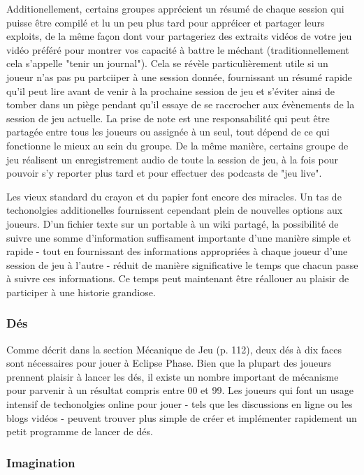 Additionellement, certains groupes apprécient un résumé de chaque session qui puisse être compilé et lu un peu plus tard pour appréicer et partager leurs exploits, de la même façon dont vour partageriez des extraits vidéos de votre jeu vidéo préféré pour montrer vos capacité à battre le méchant (traditionnellement cela s'appelle "tenir un journal"). Cela se révèle particulièrement utile si un joueur n'as pas pu partciiper à une session donnée, fournissant un résumé rapide qu'il peut lire avant de venir à la prochaine session de jeu et s'éviter ainsi de tomber dans un piège pendant qu'il essaye de se raccrocher aux évènements de la session de jeu actuelle. La prise de note est une responsabilité qui peut être partagée entre tous les joueurs ou assignée à un seul, tout dépend de ce qui fonctionne le mieux au sein du groupe. De la même manière, certains groupe de jeu réalisent un enregistrement audio de toute la session de jeu, à la fois pour pouvoir s'y reporter plus tard et pour effectuer des podcasts de "jeu live". 

Les vieux standard du crayon et du papier font encore des miracles. Un tas de techonolgies additionelles fournissent cependant plein de nouvelles options aux joueurs. D'un fichier texte sur un portable à un wiki partagé, la possibilité de suivre une somme d'information suffisament importante d'une manière simple et rapide - tout en fournissant des informations appropriées à chaque joueur d'une session de jeu à l'autre - réduit de manière significative le temps que chacun passe à suivre ces informations. Ce temps peut maintenant être réallouer au plaisir de participer à une historie grandiose. 



\subsubsection{Dés} \label{sec:dice} 

Comme décrit dans la section Mécanique de Jeu (p. 112), deux dés à dix faces sont nécessaires pour jouer à Eclipse Phase. Bien que la plupart des joueurs prennent plaisir à lancer les dés, il existe un nombre important de mécanisme pour parvenir à un résultat compris entre 00 et 99. Les joueurs qui font un usage intensif de techonolgies online pour jouer - tels que les discussions en ligne ou les blogs vidéos - peuvent trouver plus simple de créer et implémenter rapidement un petit programme de lancer de dés. 



\subsubsection{Imagination} \label{sec:imagination} 


